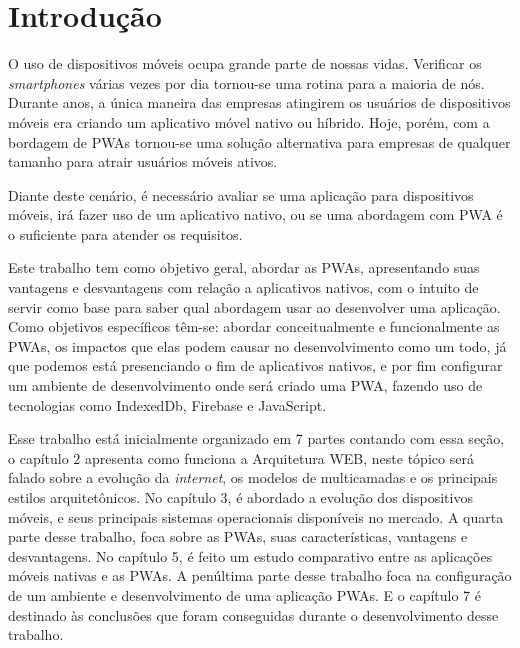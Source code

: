 
\chapter{\textbf{Introdução}}

O uso de dispositivos móveis ocupa grande parte de nossas vidas. Verificar os \textit{smartphones} várias vezes por dia tornou-se uma rotina para a maioria de nós. Durante anos, a única maneira das empresas atingirem os usuários de dispositivos móveis era criando um aplicativo móvel nativo ou híbrido. Hoje, porém, com a bordagem de \ac{PWA}s tornou-se uma solução alternativa para empresas de qualquer tamanho para atrair usuários móveis ativos.


Diante deste cenário, é necessário avaliar se uma aplicação para dispositivos móveis, irá fazer uso de um aplicativo nativo, ou se uma abordagem com \ac{PWA} é o suficiente para atender os requisitos.

Este trabalho tem como objetivo geral, abordar as \ac{PWA}s, apresentando suas vantagens e desvantagens com relação a aplicativos nativos, com o intuito de  servir como base para saber qual abordagem usar ao desenvolver uma aplicação. Como objetivos específicos têm-se:  abordar conceitualmente e funcionalmente as \ac{PWA}s,
os impactos que elas podem causar no desenvolvimento como um todo, já que podemos está presenciando o fim de aplicativos nativos, e por fim
configurar um ambiente de desenvolvimento onde será criado uma \ac{PWA},
fazendo uso de tecnologias como IndexedDb, Firebase e JavaScript.

Esse trabalho está inicialmente organizado em 7 partes contando com essa seção,
o capítulo 2 apresenta como funciona a Arquitetura WEB, neste tópico será falado sobre a evolução da \textit{internet}, os modelos de multicamadas e os principais estilos arquitetônicos. No capítulo 3, é abordado a  evolução dos dispositivos móveis, e seus principais sistemas operacionais disponíveis no mercado.  A quarta parte desse trabalho, foca sobre as \ac{PWA}s, suas características, vantagens e desvantagens. No capítulo 5, é feito um estudo comparativo entre as aplicações móveis nativas e as {PWA}s. A penúltima parte desse trabalho foca na  configuração de um ambiente  e desenvolvimento de uma aplicação \ac{PWA}s.
E  o capítulo 7 é destinado às conclusões que foram conseguidas durante o desenvolvimento desse trabalho.

